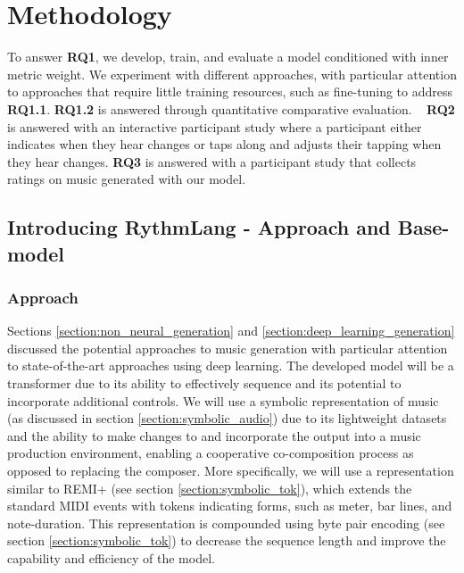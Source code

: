 \chapter{Methodology}
To answer \textbf{RQ1}, we develop, train, and evaluate a model conditioned with inner metric weight. We experiment with different approaches, with particular attention to approaches that require little training resources, such as fine-tuning to address \textbf{RQ1.1}. \textbf{RQ1.2} is answered through quantitative comparative evaluation.   
\textbf{RQ2} is answered with an interactive participant study where a participant either indicates when they hear changes or taps along and adjusts their tapping when they hear changes. \textbf{RQ3} is answered with a participant study that collects ratings on music generated with our model. 

\section{Introducing RythmLang - Approach and Base-model}

\subsection{Approach}
Sections \ref{section:non_neural_generation} and \ref{section:deep_learning_generation} discussed the potential approaches to music generation with particular attention to state-of-the-art approaches using deep learning. The developed model will be a transformer due to its ability to effectively sequence and its potential to incorporate additional controls. We will use a symbolic representation of music (as discussed in section \ref{section:symbolic_audio}) due to its lightweight datasets and the ability to make changes to and incorporate the output into a music production environment, enabling a cooperative co-composition process as opposed to replacing the composer. More specifically, we will use a representation similar to REMI+ (see section \ref{section:symbolic_tok}), which extends the standard MIDI events with tokens indicating forms, such as meter, bar lines, and note-duration. This representation is compounded using byte pair encoding (see section \ref{section:symbolic_tok}) to decrease the sequence length and improve the capability and efficiency of the model. \\ 

